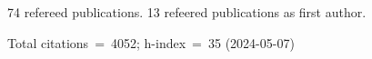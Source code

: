74 refereed publications. 13 refeered publications as first author.

Total citations~=~4052; h-index~=~35 (2024-05-07)